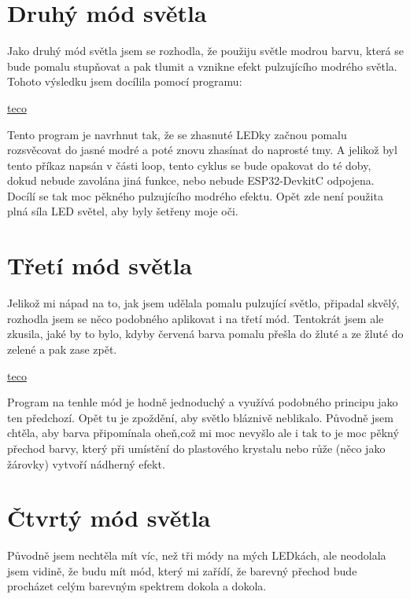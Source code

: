 \section{Druhý mód světla}
Jako druhý mód světla jsem se rozhodla, že použiju světle modrou barvu, která se bude pomalu stupňovat a pak tlumit a vznikne efekt pulzujícího modrého světla. Tohoto výsledku jsem docílila pomocí programu: 

\href{https://www.tecomat.cz/products/}{teco}

%


Tento program je navrhnut tak, že se zhasnuté LEDky začnou pomalu rozsvěcovat do jasné modré a poté znovu zhasínat do naprosté tmy. A jelikož byl tento příkaz napsán v části loop, tento cyklus se bude opakovat do té doby, dokud nebude zavolána jiná funkce, nebo nebude ESP32-DevkitC odpojena. Docílí se tak moc pěkného pulzujícího modrého efektu. Opět zde není použita plná síla LED světel, aby byly šetřeny moje oči.  


\section{Třetí mód světla}
Jelikož mi nápad na to, jak jsem udělala pomalu pulzující světlo, připadal skvělý, rozhodla jsem se něco podobného aplikovat i na třetí mód. Tentokrát jsem ale zkusila, jaké by to bylo, kdyby červená barva pomalu přešla do žluté a ze žluté do zelené a pak zase zpět. 

\href{https://www.tecomat.cz/products/}{teco}

%


Program na tenhle mód je hodně jednoduchý a využívá podobného principu jako ten předchozí. Opět tu je zpoždění, aby světlo bláznivě neblikalo. Původně jsem chtěla, aby barva připomínala oheň,což mi moc nevyšlo ale i tak to je moc pěkný přechod barvy, který při umístění do plastového krystalu nebo růže (něco jako žárovky) vytvoří nádherný efekt.

\section{Čtvrtý mód světla}
Původně jsem nechtěla mít víc, než tři módy na mých LEDkách, ale neodolala jsem vidině, že budu mít mód, který mi zařídí, že barevný přechod bude procházet celým barevným spektrem  dokola a dokola. 

